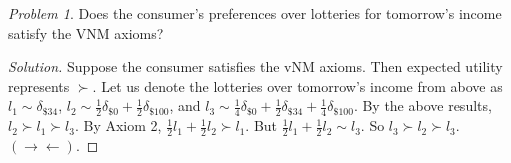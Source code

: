 \documentclass[12pt]{article}
\theoremstyle{definition}
\theoremstyle{remark}
\newtheorem{prob}{Problem}[section]
\def\contra{\rightarrow \leftarrow}
\begin{document}
\begin{prob}
  Does the consumer's preferences over lotteries for tomorrow's income satisfy the VNM axioms?
\end{prob}
\begin{proof}[Solution]
  Suppose the consumer satisfies the vNM axioms. Then expected utility represents $\succ$. Let us denote the lotteries over tomorrow's income from above as $l_1 \sim \delta_{\$34}$, $l_2 \sim \frac{1}{2}\delta_{\$0} + \frac{1}{2}\delta_{\$100}$, and $l_3 \sim \frac{1}{4}\delta_{\$0} +
  \frac{1}{2}\delta_{\$34} + \frac{1}{4}\delta_{\$100}$. By the above results, $l_2 \succ l_1 \succ l_3$.
  By Axiom 2, $\frac{1}{2}l_1 + \frac{1}{2}l_2 \succ l_1$. But $\frac{1}{2}l_1 + \frac{1}{2}l_2 \sim l_3$. So $l_3 \succ l_2 \succ l_3$. $(\contra)$.
\end{proof}
%
%
\end{document}
